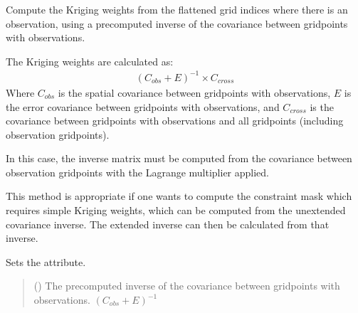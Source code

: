 \documentclass[letterpaper,10pt,english]{sphinxmanual}
\begin{document}
\begin{fulllineitems}
\begin{fulllineitems}
\end{fulllineitems}


\begin{fulllineitems}
\label{\detokenize{kriging:glomar_gridding.kriging.OrdinaryKriging.kriging_weights_from_inverse}}
\pysigstartsignatures
\pysiglinewithargsret
{}
{}
{}
\pysigstopsignatures
\sphinxAtStartPar
Compute the Kriging weights from the flattened grid indices where
there is an observation, using a pre\sphinxhyphen{}computed inverse of the covariance
between grid\sphinxhyphen{}points with observations.

\sphinxAtStartPar
The Kriging weights are calculated as:
\begin{equation*}
\begin{split}(C_{obs} + E)^{-1} \times C_{cross}\end{split}
\end{equation*}
\sphinxAtStartPar
Where \(C_{obs}\) is the spatial covariance between grid\sphinxhyphen{}points
with observations, \(E\) is the error covariance between grid\sphinxhyphen{}points
with observations, and \(C_{cross}\) is the covariance between
grid\sphinxhyphen{}points with observations and all grid\sphinxhyphen{}points (including observation
grid\sphinxhyphen{}points).

\sphinxAtStartPar
In this case, the inverse matrix must be computed from the covariance
between observation grid\sphinxhyphen{}points with the Lagrange multiplier applied.

\sphinxAtStartPar
This method is appropriate if one wants to compute the constraint mask
which requires simple Kriging weights, which can be computed from the
unextended covariance inverse. The extended inverse can then be
calculated from that inverse.

\sphinxAtStartPar
Sets the  attribute.
\begin{quote}\begin{description}
\sphinxAtStartPar
{} () \textendash{} The pre\sphinxhyphen{}computed inverse of the covariance between grid\sphinxhyphen{}points with
observations. \((C_{obs} + E)^{-1}\)


\end{description}
\end{quote}
\end{fulllineitems}
\end{fulllineitems}
\end{document}
